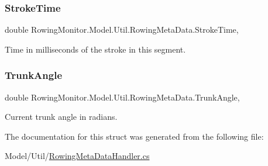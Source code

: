 \subsubsection{\texorpdfstring{Stroke\+Time}{StrokeTime}}
{\footnotesize\ttfamily double Rowing\+Monitor.\+Model.\+Util.\+Rowing\+Meta\+Data.\+Stroke\+Time\hspace{0.3cm}{\ttfamily [get]}, {\ttfamily [set]}}



Time in milliseconds of the stroke in this segment. 

\mbox{\label{struct_rowing_monitor_1_1_model_1_1_util_1_1_rowing_meta_data_af5d1c9f60b7d822db1aa9054e7a9e8ff}} 
\subsubsection{\texorpdfstring{Trunk\+Angle}{TrunkAngle}}
{\footnotesize\ttfamily double Rowing\+Monitor.\+Model.\+Util.\+Rowing\+Meta\+Data.\+Trunk\+Angle\hspace{0.3cm}{\ttfamily [get]}, {\ttfamily [set]}}



Current trunk angle in radians. 



The documentation for this struct was generated from the following file\+:\begin{DoxyCompactItemize}
\item 
Model/\+Util/\hyperlink{_rowing_meta_data_handler_8cs}{Rowing\+Meta\+Data\+Handler.\+cs}\end{DoxyCompactItemize}
